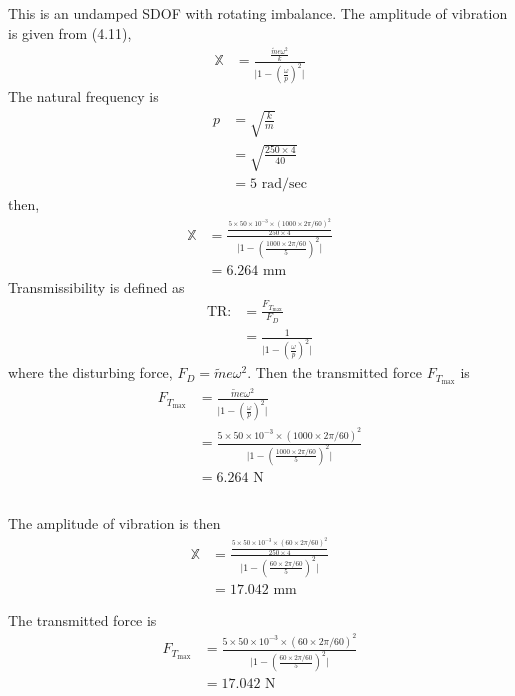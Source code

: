 \subsection{}
This is an undamped SDOF with rotating imbalance. The amplitude of vibration is given from (4.11), 
\begin{align*}
    \mathbb{X} &= \frac{\frac{\tilde{m} e\omega^2}{k}}{\bigg| 1- \left(\frac{\omega}{p}\right)^2 \bigg|}
\end{align*}
The natural frequency is
\begin{align*}
    p &= \sqrt{\frac{k}{m}} \\
    &= \sqrt{\frac{250 \times 4}{40}} \\
    &= 5 \text{ rad/sec}
\end{align*}
then,
\begin{align*}
    \mathbb{X} &= \frac{\frac{5 \times 50 \times 10^{-3} \times (1000 \times 2\pi/60)^2}{250 \times 4}}{\bigg| 1- \left(\frac{1000 \times 2\pi/60}{5}\right)^2 \bigg|} \\
    &= \boxed{6.264 \text{ mm}}
\end{align*}
Transmissibility is defined as
\begin{align*}
    \text{TR} :&= \frac{F_{T_{\text{max}}}}{F_{D}} \\
    &= \frac{1}{\bigg| 1- \left(\frac{\omega}{p}\right)^2 \bigg|}
\end{align*}
where the disturbing force, $F_{D} = \tilde{m} e \omega^2$. Then the transmitted force $F_{T_{\text{max}}}$ is
\begin{align*}
    F_{T_{\text{max}}} &= \frac{\tilde{m} e \omega^2}{\bigg| 1- \left(\frac{\omega}{p}\right)^2 \bigg|} \\
    &= \frac{5 \times 50 \times 10^{-3} \times (1000 \times 2\pi/60)^2}{\bigg| 1- \left(\frac{1000 \times 2\pi/60}{5}\right)^2 \bigg|} \\
    &= \boxed{6.264 \text{ N}}
\end{align*}

\subsection{}
The amplitude of vibration is then
\begin{align*}
    \mathbb{X} &= \frac{\frac{5 \times 50 \times 10^{-3} \times (60 \times 2\pi/60)^2}{250 \times 4}}{\bigg| 1- \left(\frac{60 \times 2\pi/60}{5}\right)^2 \bigg|} \\
    &= \boxed{17.042 \text{ mm}}
\end{align*}

The transmitted force is
\begin{align*}
    F_{T_{\text{max}}} &= \frac{5 \times 50 \times 10^{-3} \times (60 \times 2\pi/60)^2}{\bigg| 1- \left(\frac{60 \times 2\pi/60}{5}\right)^2 \bigg|} \\
    &= \boxed{17.042 \text{ N}}
\end{align*}